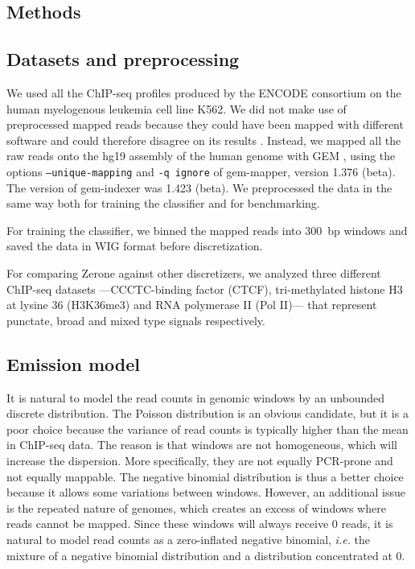 \documentclass{bioinfo}
\begin{document}
\begin{methods}
\section{Methods}

\subsection{Datasets and preprocessing}
We used all the ChIP-seq profiles produced by the ENCODE consortium on the human
myelogenous leukemia cell line K562. We did not make use of preprocessed mapped
reads because they could have been mapped with different software and could
therefore disagree on its results \citep{Szalkowski2011}. Instead, we mapped all
the raw reads onto the hg19 assembly of the human genome with GEM
\citep{Marco-Sola2012}, using the options \texttt{--unique-mapping} and
\texttt{-q ignore} of gem-mapper, version 1.376 (beta). The version of
gem-indexer was 1.423 (beta). We preprocessed the data in the same
way both for training the classifier and for benchmarking.

For training the classifier, we binned the mapped reads into 300~bp windows and
saved the data in WIG format before discretization.

For comparing Zerone against other discretizers, we analyzed three different
ChIP-seq datasets ---CCCTC-binding factor (CTCF), tri-methylated histone H3 at
lysine 36 (H3K36me3) and RNA polymerase II (Pol II)--- that represent punctate,
broad and mixed type signals respectively.

\subsection{Emission model}
It is natural to model the read counts in genomic windows by an unbounded
discrete distribution. The Poisson distribution is an obvious candidate,
but it is a poor choice because the variance of read counts is typically
higher than the mean in ChIP-seq data. The reason is that windows are not
homogeneous, which will increase the dispersion. More specifically, they
are not equally PCR-prone and not equally mappable. The negative binomial
distribution is thus a better choice because it allows some variations
between windows. However, an additional issue is the repeated nature of
genomes, which creates an excess of windows where reads cannot be mapped.
Since these windows will always receive 0 reads, it is natural to model
read counts as a zero-inflated negative binomial, \textit{i.e.} the mixture
of a negative binomial distribution and a distribution concentrated at 0.


\end{methods}
\end{document}
